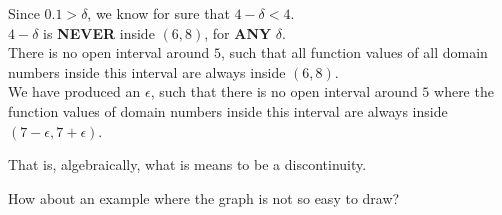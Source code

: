 \documentclass{ximera}
\begin{document}
\begin{example}
\begin{explanation}
\begin{image}
\end{image}



Since $0.1 > \delta$, we know for sure that $4 - \delta < 4$.  \\
$4 - \delta$ is \textbf{\textcolor{red!70!black}{NEVER}} inside $(6, 8)$, for \textbf{\textcolor{red!70!black}{ANY}} $\delta$.\\



There is no open interval around $5$, such that all function values of all domain numbers inside this interval are always inside $(6,8)$. \\




We have produced an $\epsilon$, such that there is no open interval around $5$ where the function values of domain numbers inside this interval are always inside $(7-\epsilon , 7+\epsilon)$.


That is, algebraically, what is means to be a discontinuity.



\end{explanation}
\end{example}




























How about an example where the graph is not so easy to draw?
\end{document}
